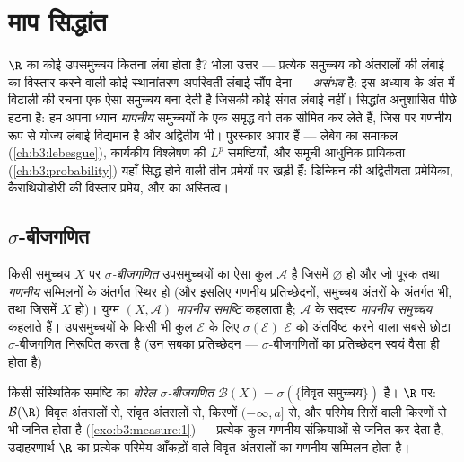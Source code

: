\chapter{माप सिद्धांत}\label{ch:b3:measure}

$\R$ का कोई उपसमुच्चय कितना लंबा होता है? भोला उत्तर --- प्रत्येक
समुच्चय को अंतरालों की लंबाई का विस्तार करने वाली कोई
स्थानांतरण-अपरिवर्ती लंबाई सौंप देना --- \emph{असंभव} है: इस
अध्याय के अंत में विटाली की रचना एक ऐसा समुच्चय बना देती है जिसकी
कोई संगत लंबाई नहीं।  सिद्धांत अनुशासित पीछे हटना है: हम अपना
ध्यान \emph{मापनीय} समुच्चयों के एक समृद्ध वर्ग तक सीमित कर लेते
हैं, जिस पर गणनीय रूप से योज्य लंबाई विद्यमान है और अद्वितीय भी।
पुरस्कार अपार हैं --- लेबेग का समाकल (\cref{ch:b3:lebesgue}), कार्यकीय विश्लेषण की
$L^p$ समष्टियाँ, और समूची आधुनिक प्रायिकता (\cref{ch:b3:probability}) यहाँ सिद्ध होने
वाली तीन प्रमेयों पर खड़ी हैं: डिन्किन की अद्वितीयता प्रमेयिका,
कैराथियोडोरी की विस्तार प्रमेय, और  का अस्तित्व।

\section{$\sigma$-बीजगणित}

\begin{definition}\label{def:b3:measure:sigmaalgebra}
किसी समुच्चय $X$ पर \emph{$\sigma$-बीजगणित}
उपसमुच्चयों का ऐसा कुल $\mathcal A$ है जिसमें $\varnothing$ हो और जो पूरक तथा
\emph{गणनीय} सम्मिलनों के अंतर्गत स्थिर हो (और इसलिए गणनीय
प्रतिच्छेदनों, समुच्चय अंतरों के अंतर्गत भी, तथा जिसमें $X$ हो)।
युग्म $(X, \mathcal A)$ \emph{मापनीय समष्टि} कहलाता है; $\mathcal A$ के सदस्य
\emph{मापनीय समुच्चय} कहलाते हैं। उपसमुच्चयों के किसी भी कुल $\mathcal E$
के लिए $\sigma(\mathcal E)$ $\mathcal E$ को अंतर्विष्ट करने वाला सबसे छोटा
$\sigma$-बीजगणित निरूपित करता है (उन सबका प्रतिच्छेदन ---
$\sigma$-बीजगणितों का प्रतिच्छेदन स्वयं वैसा ही होता है)।
\end{definition}

\begin{definition}\label{def:b3:measure:borel}
किसी संस्थितिक समष्टि का \emph{बोरेल $\sigma$-बीजगणित} $\mathcal B(X) = \sigma(\{\text{विवृत समुच्चय}\})$ है। $\R$ पर: $\mathcal B(\R)$ विवृत अंतरालों से,
संवृत अंतरालों से, किरणों $(-\infty, a]$ से, और परिमेय सिरों वाली किरणों से
भी जनित होता है (\cref{exo:b3:measure:1}) --- प्रत्येक कुल गणनीय संक्रियाओं से  जनित कर देता है, उदाहरणार्थ $\R$ का प्रत्येक  परिमेय आँकड़ों वाले विवृत अंतरालों का गणनीय सम्मिलन होता
है।
\end{definition}

